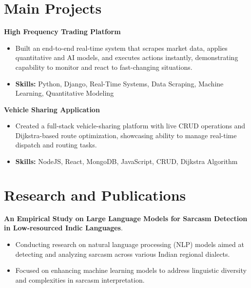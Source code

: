 \documentclass[a4paper,11pt]{article}
\begin{document}
\section{\textbf{Main Projects}}

\vspace{1mm}
  \textbf{High Frequency Trading Platform  }
\vspace{-1.5mm} %
\begin{itemize}
  \item Built an end-to-end real-time system that scrapes market data, applies quantitative and AI models, and executes actions instantly, demonstrating capability to monitor and react to fast-changing situations.
\vspace{-3mm}
  \item \textbf{Skills:} Python, Django, Real-Time Systems, Data Scraping, Machine Learning, Quantitative Modeling
\end{itemize}


\vspace{1mm}
   \textbf{Vehicle Sharing Application }
\vspace{-1.5mm} %
\begin{itemize}
  \item Created a full-stack vehicle-sharing platform with live CRUD operations and Dijkstra-based route optimization, showcasing ability to manage real-time dispatch and routing tasks.
\vspace{-3mm}
  \item \textbf{Skills:} NodeJS, React, MongoDB, JavaScript, CRUD, Dijkstra Algorithm
\end{itemize}



\section{\textbf{Research and Publications} \hfill }
\vspace{1mm}
  \textbf{An Empirical Study on Large Language Models for Sarcasm Detection in Low-resourced Indic Languages}.
\vspace{-1mm} %
\begin{itemize}
  \item Conducting research on natural language processing (NLP) models aimed at detecting and analyzing sarcasm across various Indian regional dialects.
\vspace{-3mm}
  \item Focused on enhancing machine learning models to address linguistic diversity and complexities in sarcasm interpretation.
\end{itemize}
\end{document}
